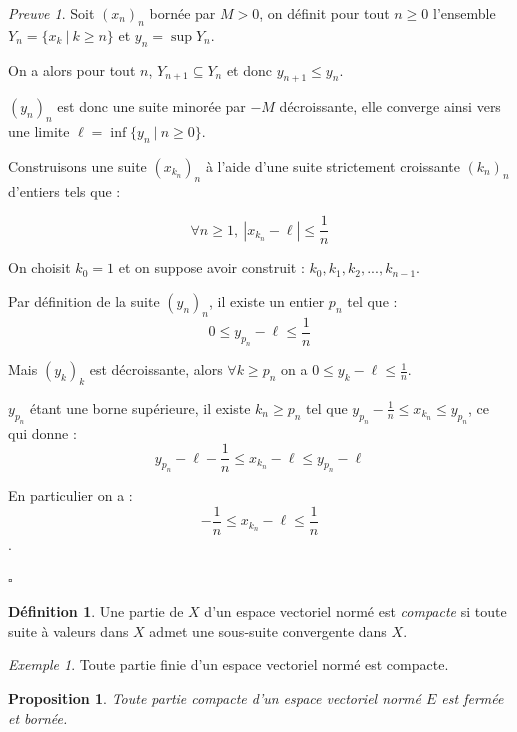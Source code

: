 \documentclass[]{article}
\newtheorem{myproposition}{Proposition}
\theoremstyle{remark}
\newtheorem{myproof}{Preuve}
\newtheorem{myexmpl}{Exemple}
\theoremstyle{definition}
\newtheorem{mydef}{Définition}
\newcommand{\cqfd}{
	\hfill$\square$
}
\begin{document}
\begin{myproof}
	Soit $(x_n)_n$ bornée par $M > 0$, on définit pour tout $n \geqslant 0$ l'ensemble $Y_n = \{x_k ~ | ~ k \geqslant n\}$ et $y_n=\sup Y_n$.
	
	On a alors pour tout $n$, $Y_{n+1} \subseteq Y_n$ et donc $y_{n+1} \leqslant y_n$.
	
	$(y_n)_n$ est donc une suite minorée par $-M$ décroissante, elle converge ainsi vers une limite $\ell = \inf \{y_n ~ | ~ n \geqslant 0\}$.
	
	Construisons une suite $(x_{k_n})_n$ à l'aide d'une suite strictement croissante $(k_n)_n$ d'entiers tels que :
	
	$$\forall n \geqslant 1, ~ |x_{k_n}-\ell| \leqslant \frac{1}{n}$$
	
	On choisit $k_0 = 1$ et on suppose avoir construit : $k_0, k_1, k_2, ..., k_{n-1}$.
	
	Par définition de la suite $(y_n)_n$, il existe un entier $p_n$ tel que : $$0 \leqslant y_{p_n} - \ell \leqslant \frac{1}{n}$$
	
	Mais $(y_k)_k$ est décroissante, alors $\forall k \geqslant p_n$ on a $0 \leqslant y_k - \ell \leqslant \frac{1}{n}$.
	
	$y_{p_n}$ étant une borne supérieure, il existe $k_n \geqslant p_n$ tel que $y_{p_n} - \frac{1}{n} \leqslant x_{k_n} \leqslant y_{p_n}$, ce qui donne :
	$$y_{p_n} - \ell - \frac{1}{n} \leqslant x_{k_n} - \ell \leqslant y_{p_n} - \ell$$
	
	En particulier on a : $$-\frac{1}{n}\leqslant x_{k_n}-\ell \leqslant \frac{1}{n}$$.
	
	\cqfd
\end{myproof}

\begin{mydef}
	Une partie de $X$ d'un espace vectoriel normé est \textit{compacte} si toute suite à valeurs dans $X$ admet une sous-suite convergente dans $X$.
\end{mydef}

\begin{myexmpl}
	Toute partie finie d'un espace vectoriel normé est compacte.
\end{myexmpl}

\begin{myproposition}
	Toute partie compacte d'un espace vectoriel normé $E$ est fermée et bornée.
\end{myproposition}
\end{document}
